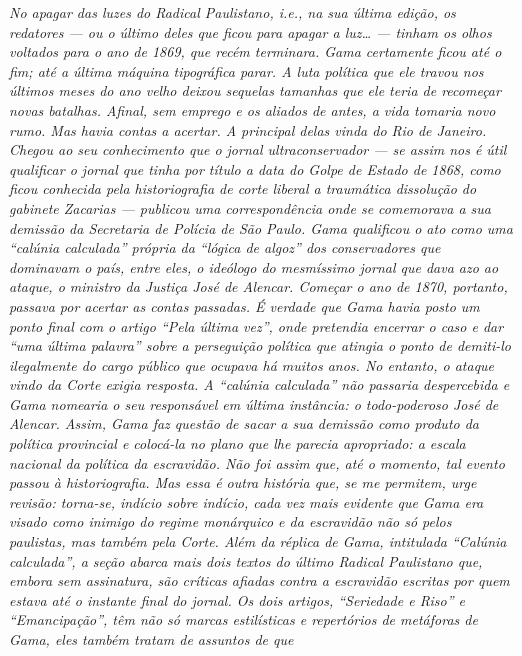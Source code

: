 \begin{argumento}\itshape
No apagar das luzes do \textnormal{Radical Paulistano}, i.e., na sua
última edição, os redatores --- ou o último deles que ficou para apagar a
luz\ldots{} --- tinham os olhos voltados para o ano de 1869, que recém
terminara. Gama certamente ficou até o fim; até a última máquina
tipográfica parar. A luta política que ele travou nos últimos meses do
ano velho deixou sequelas tamanhas que ele teria de recomeçar novas
batalhas. Afinal, sem emprego e os aliados de antes, a vida tomaria novo
rumo. Mas havia contas a acertar. A principal delas vinda do Rio de
Janeiro. Chegou ao seu conhecimento que o jornal ultraconservador --- se
assim nos é útil qualificar o jornal que tinha por título a data do
Golpe de Estado de 1868, como ficou conhecida pela historiografia de
corte liberal a traumática dissolução do gabinete Zacarias --- publicou
uma correspondência onde se comemorava a sua demissão da Secretaria de
Polícia de São Paulo. Gama qualificou o ato como uma ``calúnia calculada''
própria da ``lógica de algoz'' dos conservadores que dominavam o país,
entre eles, o ideólogo do mesmíssimo jornal que dava azo ao ataque, o
ministro da Justiça José de Alencar. Começar o ano de 1870, portanto,
passava por acertar as contas passadas. É verdade que Gama havia posto
um ponto final com o artigo ``Pela última vez'', onde pretendia
encerrar o caso e dar ``uma última palavra'' sobre a perseguição política
que atingia o ponto de demiti-lo ilegalmente do cargo público que
ocupava há muitos anos. No entanto, o ataque vindo da Corte exigia
resposta. A ``calúnia calculada'' não passaria despercebida e Gama
nomearia o seu responsável em última instância: o todo-poderoso José de
Alencar. Assim, Gama faz questão de sacar a sua demissão como produto da
política provincial e colocá-la no plano que lhe parecia apropriado: a
escala nacional da política da escravidão. Não foi assim que, até o
momento, tal evento passou à historiografia. Mas essa é outra história
que, se me permitem, urge revisão: torna-se, indício sobre indício, cada
vez mais evidente que Gama era visado como inimigo do regime monárquico
e da escravidão não só pelos paulistas, mas também pela Corte. Além da
réplica de Gama, intitulada ``Calúnia calculada'', a seção abarca
mais dois textos do último \textnormal{Radical Paulistano} que, embora sem
assinatura, são críticas afiadas contra a escravidão escritas por quem
estava até o instante final do jornal. Os dois artigos, ``Seriedade e
Riso'' e ``Emancipação'', têm não só marcas estilísticas e
repertórios de metáforas de Gama, eles também tratam de assuntos de que

\end{argumento}
